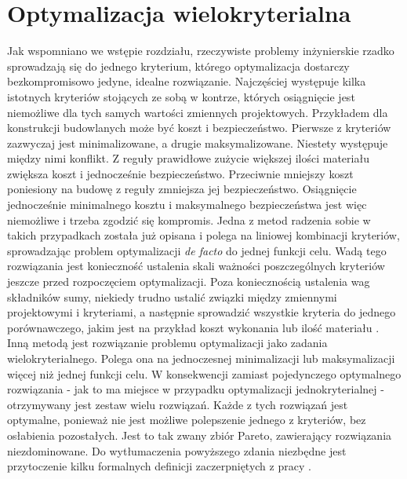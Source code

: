 \section{Optymalizacja wielokryterialna} \label{sect: multiobjective_opt}
Jak wspomniano we wstępie rozdziału, rzeczywiste problemy inżynierskie rzadko sprowadzają się do jednego kryterium, którego optymalizacja dostarczy bezkompromisowo jedyne, idealne rozwiązanie. Najczęściej występuje kilka istotnych kryteriów stojących ze sobą w kontrze, których osiągnięcie jest niemożliwe dla tych samych wartości zmiennych projektowych. Przykładem dla konstrukcji budowlanych może być koszt i bezpieczeństwo. Pierwsze z kryteriów zazwyczaj jest minimalizowane, a drugie maksymalizowane. Niestety występuje między nimi konflikt. Z reguły prawidłowe zużycie większej ilości materiału zwiększa koszt i jednocześnie bezpieczeństwo. Przeciwnie mniejszy koszt poniesiony na budowę z reguły zmniejsza jej bezpieczeństwo. Osiągnięcie jednocześnie minimalnego kosztu i maksymalnego bezpieczeństwa jest więc niemożliwe i trzeba zgodzić się kompromis. Jedna z metod radzenia sobie w takich przypadkach została już opisana i polega na liniowej kombinacji kryteriów, sprowadzając problem optymalizacji \textit{de facto} do jednej funkcji celu. Wadą tego rozwiązania jest konieczność ustalenia skali ważności poszczególnych kryteriów jeszcze przed rozpoczęciem optymalizacji. Poza koniecznością ustalenia wag składników sumy, niekiedy trudno ustalić związki między zmiennymi projektowymi i kryteriami, a następnie sprowadzić wszystkie kryteria do jednego porównawczego, jakim jest na przykład koszt wykonania lub ilość materiału \parencite{Szymczak1995}. Inną metodą jest rozwiązanie problemu optymalizacji jako zadania wielokryterialnego. Polega ona na jednoczesnej minimalizacji lub maksymalizacji więcej niż jednej funkcji celu. W konsekwencji zamiast pojedynczego optymalnego rozwiązania - jak to ma miejsce w przypadku optymalizacji jednokryterialnej - otrzymywany jest zestaw wielu rozwiązań. Każde z tych rozwiązań jest optymalne, ponieważ nie jest możliwe polepszenie jednego z kryteriów, bez osłabienia pozostałych. Jest to tak zwany zbiór Pareto, zawierający rozwiązania niezdominowane. Do wytłumaczenia powyższego zdania niezbędne jest przytoczenie kilku formalnych definicji zaczerpniętych z pracy \parencite{CoelloCoello2006}. 


